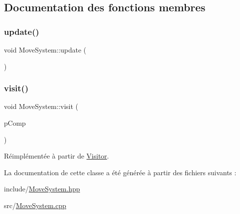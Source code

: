 \subsection{Documentation des fonctions membres}
\mbox{\label{classMoveSystem_ae2ef74a85abacc1f7d4dd02f74620ed2}} 
\subsubsection{\texorpdfstring{update()}{update()}}
{\footnotesize\ttfamily void Move\+System\+::update (\begin{DoxyParamCaption}{ }\end{DoxyParamCaption})}

\mbox{\label{classMoveSystem_a816baaf8d8d9db45b4c026902946bc1e}} 
\subsubsection{\texorpdfstring{visit()}{visit()}}
{\footnotesize\ttfamily void Move\+System\+::visit (\begin{DoxyParamCaption}\item[{\hyperlink{structPositionComponent}{Position\+Component} \&}]{p\+Comp }\end{DoxyParamCaption})\hspace{0.3cm}{\ttfamily [virtual]}}



Réimplémentée à partir de \hyperlink{classVisitor_afc865e84cb1293284e6f524a00049b11}{Visitor}.



La documentation de cette classe a été générée à partir des fichiers suivants \+:\begin{DoxyCompactItemize}
\item 
include/\hyperlink{MoveSystem_8hpp}{Move\+System.\+hpp}\item 
src/\hyperlink{MoveSystem_8cpp}{Move\+System.\+cpp}\end{DoxyCompactItemize}
